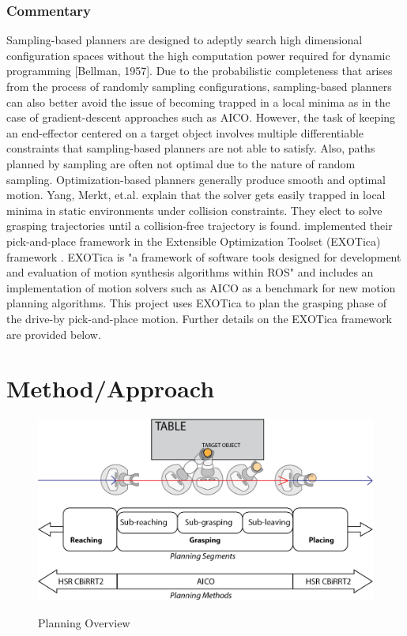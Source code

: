 \documentclass[11pt]{article}
\begin{document}
        \subsubsection{Commentary}
            \par Sampling-based planners are designed to adeptly search high dimensional configuration spaces without the high computation power required for dynamic programming [Bellman, 1957]. Due to the probabilistic completeness that arises from the process of randomly sampling configurations, sampling-based planners can also better avoid the issue of becoming trapped in a local minima as in the case of gradient-descent approaches such as AICO. However, the task of keeping an end-effector centered on a target object involves multiple differentiable constraints that sampling-based planners are not able to satisfy. Also, paths planned by sampling are often not optimal due to the nature of random sampling. Optimization-based planners generally produce smooth and optimal motion.
            Yang, Merkt, et.al. explain that the solver gets easily trapped in local minima in static environments under collision constraints. They elect to solve grasping trajectories until a collision-free trajectory is found. \cite{yang_planning_2018} implemented their pick-and-place framework in the Extensible Optimization Toolset (EXOTica) framework \cite{koubaa_exotica_2019}. EXOTica is "a framework of software tools designed for development and evaluation of motion synthesis algorithms within ROS" and includes an implementation of motion solvers such as AICO as a benchmark for new motion planning algorithms.\cite{koubaa_exotica_2019} This project uses EXOTica to plan the grasping phase of the drive-by pick-and-place motion. Further details on the EXOTica framework are provided below.
    \newpage
    \section{Method/Approach}
        \begin{figure}
            \centering
            \includegraphics[width=0.95\linewidth]{illustrator/segments.png}
            \label{fig:segments}
            \caption{Planning Overview}
        \end{figure}
\end{document}
